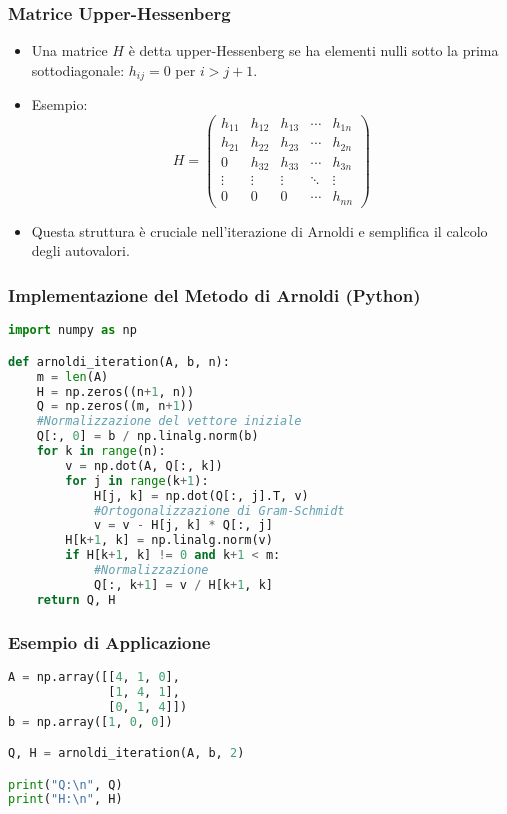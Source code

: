 \documentclass{beamer}
\begin{document}
\begin{frame}
\frametitle{Matrice Upper-Hessenberg}
\begin{itemize}
\item Una matrice \(H\) è detta upper-Hessenberg se ha elementi nulli sotto la prima sottodiagonale: \(h_{ij} = 0\) per \(i > j + 1\).
\item Esempio:
\[
H = \begin{pmatrix}
h_{11} & h_{12} & h_{13} & \cdots & h_{1n} \\
h_{21} & h_{22} & h_{23} & \cdots & h_{2n} \\
0 & h_{32} & h_{33} & \cdots & h_{3n} \\
\vdots & \vdots & \vdots & \ddots & \vdots \\
0 & 0 & 0 & \cdots & h_{nn}
\end{pmatrix}
\]
\item Questa struttura è cruciale nell'iterazione di Arnoldi e semplifica il calcolo degli autovalori.
\end{itemize}
\end{frame}

\begin{frame}[fragile]
\frametitle{Implementazione del Metodo di Arnoldi (Python)}
\begin{lstlisting}[language=Python, basicstyle=\footnotesize, frame=single, numbers=none]
import numpy as np

def arnoldi_iteration(A, b, n):
    m = len(A)
    H = np.zeros((n+1, n))
    Q = np.zeros((m, n+1))
    #Normalizzazione del vettore iniziale
    Q[:, 0] = b / np.linalg.norm(b)
    for k in range(n):
        v = np.dot(A, Q[:, k])
        for j in range(k+1):
            H[j, k] = np.dot(Q[:, j].T, v)
            #Ortogonalizzazione di Gram-Schmidt
            v = v - H[j, k] * Q[:, j]
        H[k+1, k] = np.linalg.norm(v)
        if H[k+1, k] != 0 and k+1 < m:
            #Normalizzazione
            Q[:, k+1] = v / H[k+1, k]
    return Q, H
\end{lstlisting}
\end{frame}

\begin{frame}[fragile]
\frametitle{Esempio di Applicazione}
\begin{lstlisting}[language=Python, basicstyle=\footnotesize, frame=single, numbers=none]
A = np.array([[4, 1, 0],
              [1, 4, 1],
              [0, 1, 4]])
b = np.array([1, 0, 0])

Q, H = arnoldi_iteration(A, b, 2)

print("Q:\n", Q)
print("H:\n", H)
\end{lstlisting}
\end{frame}
\end{document}
